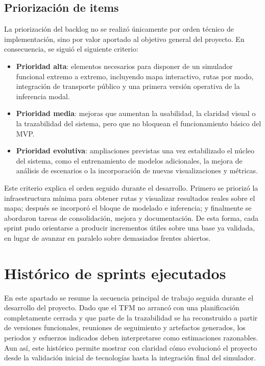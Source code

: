 \subsection{Priorización de items}

La priorización del backlog no se realizó únicamente por orden técnico de implementación, sino por valor aportado al objetivo general del proyecto. En consecuencia, se siguió el siguiente criterio:
\begin{itemize}
  \item \textbf{Prioridad alta}: elementos necesarios para disponer de un simulador funcional extremo a extremo, incluyendo mapa interactivo, rutas por modo, integración de transporte público y una primera versión operativa de la inferencia modal.
  \item \textbf{Prioridad media}: mejoras que aumentan la usabilidad, la claridad visual o la trazabilidad del sistema, pero que no bloquean el funcionamiento básico del MVP.
  \item \textbf{Prioridad evolutiva}: ampliaciones previstas una vez estabilizado el núcleo del sistema, como el entrenamiento de modelos adicionales, la mejora de análisis de escenarios o la incorporación de nuevas visualizaciones y métricas.
\end{itemize}

Este criterio explica el orden seguido durante el desarrollo. Primero se priorizó la infraestructura mínima para obtener rutas y visualizar resultados reales sobre el mapa; después se incorporó el bloque de modelado e inferencia; y finalmente se abordaron tareas de consolidación, mejora y documentación. De esta forma, cada sprint pudo orientarse a producir incrementos útiles sobre una base ya validada, en lugar de avanzar en paralelo sobre demasiados frentes abiertos.

\section{Histórico de sprints ejecutados}

En este apartado se resume la secuencia principal de trabajo seguida durante el desarrollo del proyecto. Dado que el TFM no arrancó con una planificación completamente cerrada y que parte de la trazabilidad se ha reconstruido a partir de versiones funcionales, reuniones de seguimiento y artefactos generados, los periodos y esfuerzos indicados deben interpretarse como estimaciones razonables. Aun así, este histórico permite mostrar con claridad cómo evolucionó el proyecto desde la validación inicial de tecnologías hasta la integración final del simulador.

